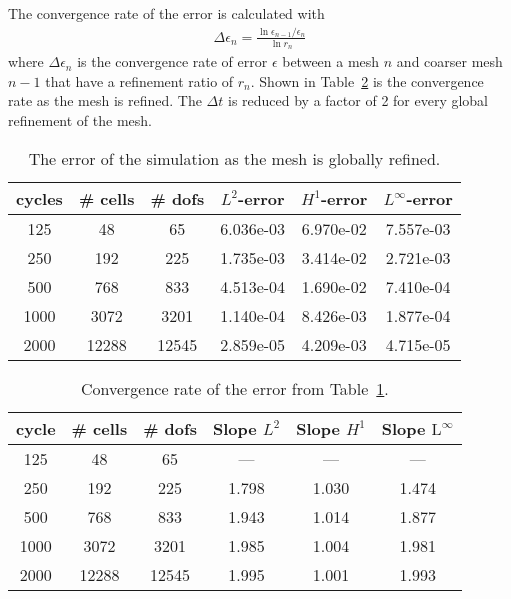 \documentclass{article}
\begin{document}
The convergence rate of the error is calculated with
\begin{align*}
  \Delta \epsilon_n = \frac{\ln{\epsilon_{n-1}/\epsilon_{n}}}{\ln{r_n}}
\end{align*}
where $\Delta \epsilon_n$ is the convergence rate of error $\epsilon$ between a mesh $n$ and
coarser mesh $n-1$ that have a refinement ratio of $r_n$.
Shown in Table~\ref{tbl:convergenceRate} is the convergence rate as the mesh is
refined.
The $\Delta t$ is reduced by a factor of 2 for every global refinement of the mesh.

\begin{table}\label{tbl:errorMFG}
  \begin{center}
    \begin{tabular}{|c|c|c|c|c|c|} \hline
      cycles & \# cells & \# dofs & $L^2$-error & $H^1$-error & $L^\infty$-error \\ \hline
      125 & 48 & 65 & 6.036e-03 & 6.970e-02 & 7.557e-03\\ \hline
      250 & 192 & 225 & 1.735e-03 & 3.414e-02 & 2.721e-03 \\ \hline
      500 & 768 & 833 & 4.513e-04 & 1.690e-02 & 7.410e-04 \\ \hline
      1000 & 3072 & 3201 & 1.140e-04 & 8.426e-03 & 1.877e-04 \\ \hline
      2000 & 12288 & 12545 & 2.859e-05 & 4.209e-03 & 4.715e-05 \\ \hline
    \end{tabular}
  \end{center}
  \caption{The error of the simulation as the mesh is globally refined.}
\end{table}

\begin{table}\label{tbl:convergenceRate}
  \begin{center}
    \begin{tabular}{|c|c|c|c|c|c|} \hline
      cycle & \# cells & \# dofs & Slope $L^2$ & Slope $H^1$  & Slope $\textrm{L}^\infty$ \\ \hline
      125 & 48 & 65 & --- & --- & --- \\ \hline
      250 & 192 & 225 & 1.798 & 1.030 & 1.474 \\ \hline
      500 & 768 & 833 & 1.943 & 1.014 & 1.877 \\ \hline
      1000 & 3072 & 3201 & 1.985 & 1.004 & 1.981 \\ \hline
      2000 & 12288 & 12545 & 1.995 & 1.001  & 1.993 \\ \hline
    \end{tabular}
  \end{center}
  \caption{Convergence rate of the error from Table~\ref{tbl:errorMFG}.}
\end{table}
\end{document}

